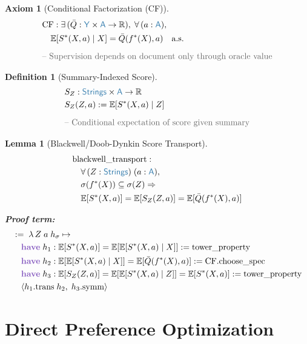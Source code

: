 \documentclass[11pt]{article}
\theoremstyle{definition}
\newtheorem{axiomenv}{Axiom}
\newtheorem{defnenv}{Definition}
\theoremstyle{plain}
\newtheorem{lemenv}{Lemma}
\newcommand{\kw}[1]{\textcolor{keyword}{\textbf{#1}}}
\newcommand{\ty}[1]{\textcolor{type}{\mathsf{#1}}}
\newcommand{\fn}[1]{\mathrm{#1}}
\newcommand{\cmt}[1]{\textcolor{comment}{\text{-- #1}}}
\newcommand{\lam}{\lambda\,}
\newcommand{\all}{\forall\,}
\newcommand{\ex}{\exists\,}
\newcommand{\arr}{\to}
\newcommand{\Arr}{\Rightarrow}
\newcommand{\defeq}{:=}
\newcommand{\pf}{:=\;}
\newcommand{\Strings}{\ty{Strings}}
\newcommand{\Y}{\ty{Y}}
\newcommand{\A}{\ty{A}}
\newcommand{\R}{\mathbb{R}}
\newcommand{\fstar}{f^*}
\newcommand{\E}{\mathbb{E}}
\begin{document}
\begin{axiomenv}[Conditional Factorization (CF)]
\label{ax:CF}
\begin{align*}
&\fn{CF} : \ex (\bar{Q} : \Y \times \A \arr \R),\; \all (a : \A),\; \\
&\quad \E[S^*(X, a) \mid X] = \bar{Q}(\fstar(X), a) \quad \text{a.s.} \\[6pt]
&\cmt{Supervision depends on document only through oracle value}
\end{align*}
\end{axiomenv}

\begin{defnenv}[Summary-Indexed Score]
\label{def:SZ}
\begin{align*}
&S_Z : \Strings \times \A \arr \R \\
&S_Z(Z, a) \defeq \E[S^*(X, a) \mid Z] \\[6pt]
&\cmt{Conditional expectation of score given summary}
\end{align*}
\end{defnenv}

\begin{lemenv}[Blackwell/Doob-Dynkin Score Transport]
\label{lem:blackwell}
\begin{align*}
&\fn{blackwell\_transport} : \\
&\quad \all (Z : \Strings)\; (a : \A), \\
&\quad \sigma(\fstar(X)) \subseteq \sigma(Z) \Arr \\
&\quad \E[S^*(X, a)] = \E[S_Z(Z, a)] = \E[\bar{Q}(\fstar(X), a)]
\end{align*}

\textbf{Proof term:}
\begin{align*}
&\pf \lam Z\; a\; h_\sigma \mapsto \\
&\quad \kw{have}\; h_1 : \E[S^*(X, a)] = \E[\E[S^*(X, a) \mid X]] := \fn{tower\_property} \\
&\quad \kw{have}\; h_2 : \E[\E[S^*(X, a) \mid X]] = \E[\bar{Q}(\fstar(X), a)] := \fn{CF}.\fn{choose\_spec} \\
&\quad \kw{have}\; h_3 : \E[S_Z(Z, a)] = \E[\E[S^*(X, a) \mid Z]] = \E[S^*(X, a)] := \fn{tower\_property} \\
&\quad \langle h_1.\fn{trans}\; h_2,\; h_3.\fn{symm} \rangle
\end{align*}
\end{lemenv}

\section{Direct Preference Optimization}
\label{sec:dpo}
\end{document}
